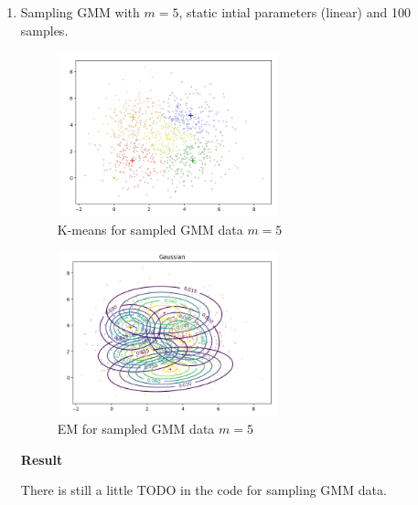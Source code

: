 \documentclass[12pt,a4paper]{article}
\begin{document}
\begin{enumerate}[start=1,label*={\arabic*.}]
  \item Sampling GMM with $m = 5$, static intial parameters (linear) and 100
  samples.
  
\begin{figure}[H]
  \centering
  \includegraphics[width=0.6\textwidth]{figures/3_1_km.png}
	\caption{K-means for sampled GMM data $m = 5$}
	\label{3_0_km}
\end{figure} 

\begin{figure}[H]
  \centering
  \includegraphics[width=0.6\textwidth]{figures/3_1_EM.png}
	\caption{EM for sampled GMM data $m = 5$}
	\label{3_0_EM}
\end{figure} 

\textbf{Result}

There is still a little TODO in the code for sampling GMM data.

\end{enumerate}

\newpage
\printbibliography
\end{document}
